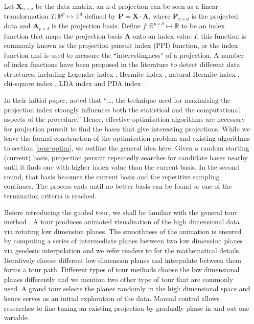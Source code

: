 \documentclass[12pt]{article}
\begin{document}
Let \(\mathbf{X}_{n \times p}\) be the data matrix, an n-d projection
can be seen as a linear transformation
\(T: \mathbb{R}^p \mapsto \mathbb{R}^d\) defined by
\(\mathbf{P} = \mathbf{X} \cdot \mathbf{A}\), where
\(\mathbf{P}_{n \times d}\) is the projected data and
\(\mathbf{A}_{p\times d}\) is the projection basis. Define
\(f: \mathbb{R}^{p \times d} \mapsto \mathbb{R}\) to be an index
function that maps the projection basis \(\mathbf{A}\) onto an index
value \(I\), this function is commonly known as the projection pursuit
index (PPI) function, or the index function and is used to measure the
``interestingness'' of a projection. A number of index functions have
been proposed in the literature to detect different data structures,
including Legendre index \citep{friedman1974projection}, Hermite index
\citep{hall1989polynomial}, natural Hermite index
\citep{cook1993projection}, chi-square index
\citep{posse1995projection}, LDA index \citep{lee2005projection} and PDA
index \citep{lee2010projection}.

In their initial paper, \citet{friedman1974projection} noted that
``\ldots{}, the technique used for maximising the projection index
strongly influences both the statistical and the computational aspects
of the procedure.'' Hence, effective optimisation algorithms are
necessary for projection pursuit to find the bases that give interesting
projections. While we leave the formal construction of the optimisation
problem and existing algorithms to section \ref{tour-optim}, we outline
the general idea here. Given a random starting (current) basis,
projection pursuit repeatedly searches for candidate bases nearby until
it finds one with higher index value than the current basis. In the
second round, that basis becomes the current basis and the repetitive
sampling continues. The process ends until no better basis can be found
or one of the termination criteria is reached.

Before introducing the guided tour, we shall be familiar with the
general tour method \citep{cook2008grand}. A tour produces animated
visualisation of the high dimensional data via rotating low dimension
planes. The smoothness of the animation is ensured by computing a series
of intermediate planes between two low dimension planes via geodesic
interpolation and we refer readers to \citet{buja2005computational} for
the mathematical details. Iteratively choose different low dimension
planes and interpolate between them forms a tour path. Different types
of tour methods choose the low dimensional planes differently and we
mention two other type of tour that are commonly used. A grand tour
selects the planes randomly in the high dimensional space and hence
serves as an initial exploration of the data. Manual control allows
researches to fine-tuning an existing projection by gradually phase in
and out one variable.
\end{document}

